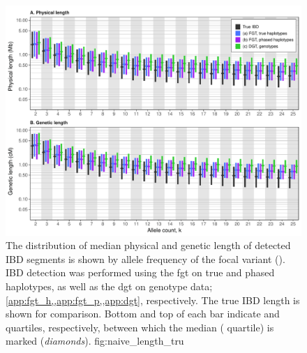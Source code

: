 

\begin{figure}[!htb]
\includegraphics[width=\textwidth]{./img/ch3/naive_length_tru}
{The distribution of median physical and genetic length of detected IBD segments is shown by allele frequency of the focal variant (\fk{[2,25]}).
IBD detection was performed using the \gls{fgt} on true and phased haplotypes, as well as the \gls{dgt} on genotype data; \cref{app:fgt_h,,app:fgt_p,,app:dgt}, respectively.
The true IBD length is shown for comparison.
Bottom and top of each bar indicate  and  quartiles, respectively, between which the median ( quartile) is marked (\emph{diamonds}).}
{fig:naive_length_tru}
\end{figure}
